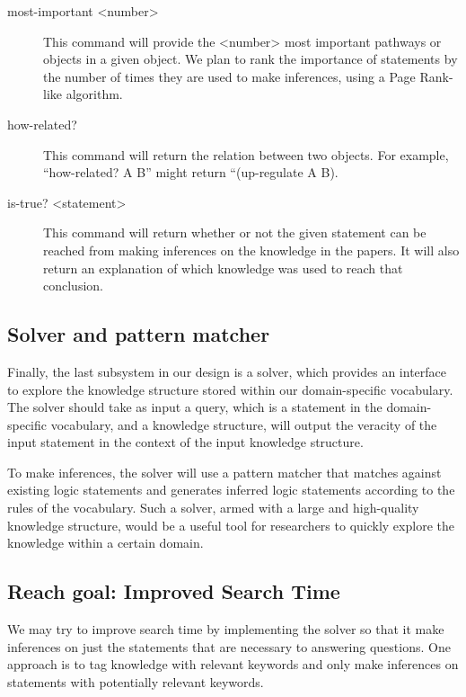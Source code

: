 \documentclass[11pt]{article}
\begin{document}
\begin{description}
\item[{most-important <number>}] This command will provide the <number> most important pathways or objects in a given object. We plan to rank the importance of statements by the number of times they are used to make inferences, using a Page Rank-like algorithm.
\end{description}


\begin{description}
\item[{how-related?}] This command will return the relation between two objects. For example, “how-related? A B” might return “(up-regulate A B).
\end{description}


\begin{description}
\item[{is-true? <statement>}] This command will return whether or not the given statement can be reached from making inferences on the knowledge in the papers. It will also return an explanation of which knowledge was used to reach that conclusion.
\end{description}

\subsection{Solver and pattern matcher
}
\label{sec-2-3}
Finally, the last subsystem in our design is a solver, which provides an interface to explore the knowledge structure stored within our domain-specific vocabulary. The solver should take as input a query, which is a statement in the domain-specific vocabulary, and a knowledge structure, will output the veracity of the input statement in the context of the input knowledge structure.


To make inferences, the solver will use a pattern matcher that matches against existing logic statements and generates inferred logic statements according to the rules of the vocabulary. Such a solver, armed with a large and high-quality knowledge structure, would be a useful tool for researchers to quickly explore the knowledge within a certain domain.

\subsection{Reach goal: Improved Search Time
}
\label{sec-2-4}


We may try to improve search time by implementing the solver so that it make inferences on just the statements that are necessary to answering questions. One approach is to tag knowledge with relevant keywords and only make inferences on statements with potentially relevant keywords.
\end{document}
